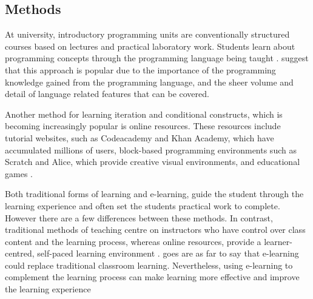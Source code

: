 \documentclass[a4paper,11.5pt]{report}
\numberwithin{figure}{section}
\numberwithin{table}{section}
\numberwithin{equation}{section}
\numberwithin{equation}{section}
\begin{document}


\subsection{Methods}

At university, introductory programming units are conventionally structured courses based on lectures and practical laboratory work. Students learn about programming concepts through the programming language being taught \citep{Robins2003, acm}. \citeauthor{Robins2003} suggest that this approach is popular due to the importance of the programming knowledge gained from the programming language, and the sheer volume and detail of language related features that can be covered.

Another method for learning iteration and conditional constructs, which is becoming increasingly popular is online resources. These resources include tutorial websites, such as Codeacademy and Khan Academy, which have accumulated millions of users, block-based programming environments such as Scratch and Alice, which provide creative visual environments, and educational games \citep{Lee2015}. 

Both traditional forms of learning and e-learning, guide the student through the learning experience and often set the students practical work to complete. However there are a few differences between these methods. In contrast, traditional methods of teaching centre on instructors who have control over class content and the learning process, whereas online resources, provide a learner-centred, self-paced learning environment \citep{Zhang2004}. \citet{Zhang2004} goes are as far to say that e-learning could replace traditional classroom learning. Nevertheless, using e-learning to complement the learning process can make learning more effective and improve the learning experience \citep{Zhang2004, Concannon2005}
\end{document}
